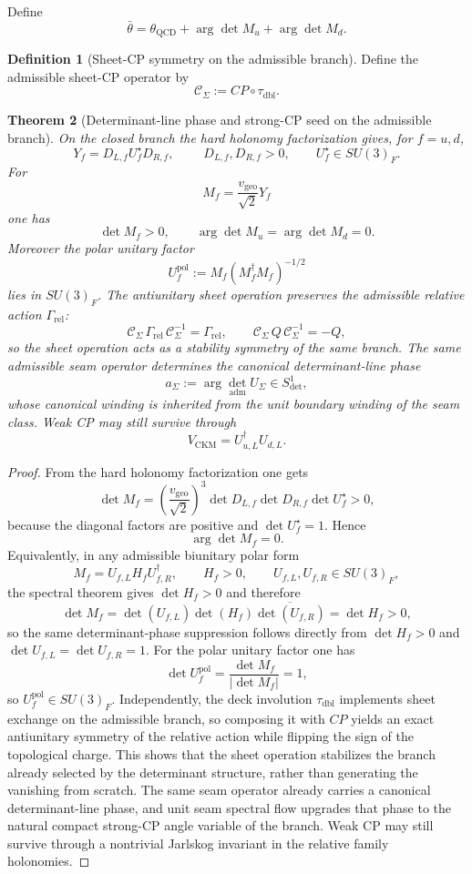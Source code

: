 \documentclass[11pt,a4paper]{article}
\newtheorem{theorem}{Theorem}[section]
\theoremstyle{definition}
\newtheorem{definition}[theorem]{Definition}
\theoremstyle{remark}
\newcommand{\taudbl}{\tau_{\mathrm{dbl}}}
\newcommand{\vgeo}{v_{\mathrm{geo}}}
\begin{document}
Define
\begin{equation}
\label{eq:strong-cp}
\bar\theta=\theta_{\mathrm{QCD}}+\arg\det M_u+\arg\det M_d.
\end{equation}
\begin{definition}[Sheet-CP symmetry on the admissible branch]
\label{def:sheet-cp-symmetry}
Define the admissible sheet-CP operator by
\[
\mathcal C_\Sigma:=CP\circ\taudbl.
\]
\end{definition}

\begin{theorem}[Determinant-line phase and strong-CP seed on the admissible branch]
\label{thm:sheet-cp-protection}
\label{thm:structural-strong-cp}
On the closed branch the hard holonomy factorization gives, for $f=u,d$,
\[
Y_f=D_{L,f}U_f^\star D_{R,f},
\qquad
\;D_{L,f},D_{R,f}>0,
\qquad
U_f^\star\in SU(3)_F.
\]
For
\[
M_f=\frac{\vgeo}{\sqrt2}Y_f
\]
one has
\[
\det M_f>0,
\qquad
\arg\det M_u=\arg\det M_d=0.
\]
Moreover the polar unitary factor
\[
U_f^{\mathrm{pol}}:=M_f(M_f^\dagger M_f)^{-1/2}
\]
lies in $SU(3)_F$. The antiunitary sheet operation
preserves the admissible relative action $\Gamma_{\mathrm{rel}}$:
\[
\mathcal C_\Sigma\,\Gamma_{\mathrm{rel}}\,\mathcal C_\Sigma^{-1}=\Gamma_{\mathrm{rel}},
\qquad
\mathcal C_\Sigma\,Q\,\mathcal C_\Sigma^{-1}=-Q,
\]
so the sheet operation acts as a stability symmetry of the same branch. The same admissible seam
operator determines the canonical determinant-line phase
\[
a_\Sigma:=\arg\det_{\mathrm{adm}}U_\Sigma\in S^1_{\det},
\]
whose canonical winding is inherited from the unit boundary winding of the seam class. Weak CP may
still survive through
\[
V_{\mathrm{CKM}}=U_{u,L}^\dagger U_{d,L}.
\]
\end{theorem}

\begin{proof}
From the hard holonomy factorization one gets
\[
\det M_f
=
\left(\frac{\vgeo}{\sqrt2}\right)^3
\det D_{L,f}\det D_{R,f}\det U_f^\star
>
0,
\]
because the diagonal factors are positive and $\det U_f^\star=1$. Hence
\[
\arg\det M_f=0.
\]
Equivalently, in any admissible biunitary polar form
\[
M_f=U_{f,L}H_fU_{f,R}^\dagger,
\qquad
H_f>0,
\qquad
U_{f,L},U_{f,R}\in SU(3)_F,
\]
the spectral theorem gives $\det H_f>0$ and therefore
\[
\det M_f=\det(U_{f,L})\det(H_f)\overline{\det(U_{f,R})}=\det H_f>0,
\]
so the same determinant-phase suppression follows directly from $\det H_f>0$ and
$\det U_{f,L}=\det U_{f,R}=1$.
For the polar unitary factor one has
\[
\det U_f^{\mathrm{pol}}
=
\frac{\det M_f}{|\det M_f|}
=
1,
\]
so $U_f^{\mathrm{pol}}\in SU(3)_F$. Independently, the deck involution $\taudbl$
implements sheet exchange on the admissible branch, so composing it with $CP$ yields an exact
antiunitary symmetry of the relative action while flipping the sign of the topological charge.
This shows that the sheet operation stabilizes the branch already selected by the determinant
structure, rather than generating the vanishing from scratch. The same seam operator already
carries a canonical determinant-line phase, and unit seam spectral flow upgrades that phase to the
natural compact strong-CP angle variable of the branch. Weak CP may still survive through a
nontrivial Jarlskog invariant in the relative family holonomies.
\end{proof}
\end{document}

